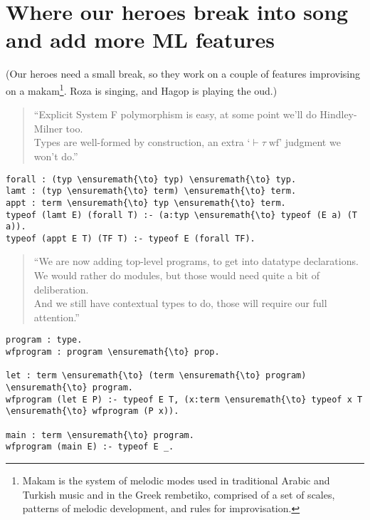 \section{Where our heroes break into song and add more ML
features}\label{where-our-heroes-break-into-song-and-add-more-ml-features}

\begin{scenecomment}
(Our heroes need a small break, so they work on a couple of features improvising on a makam\footnote{Makam is the system of melodic modes used in traditional Arabic and Turkish music and in the Greek rembetiko, comprised of a set of scales, patterns of melodic development, and rules for improvisation.}. Roza is singing, and Hagop is playing the oud.)
\end{scenecomment}

\begin{verse}
``Explicit System F polymorphism is easy, at some point we'll do Hindley-Milner too. \\
Types are well-formed by construction, an extra `$\vdash \tau \; \text{wf}$' judgment we won't do.''
\end{verse}

\begin{verbatim}
forall : (typ \ensuremath{\to} typ) \ensuremath{\to} typ.
lamt : (typ \ensuremath{\to} term) \ensuremath{\to} term.
appt : term \ensuremath{\to} typ \ensuremath{\to} term.
typeof (lamt E) (forall T) :- (a:typ \ensuremath{\to} typeof (E a) (T a)).
typeof (appt E T) (TF T) :- typeof E (forall TF).
\end{verbatim}

\begin{verse}
``We are now adding top-level programs, to get into datatype declarations. \\
We would rather do modules, but those would need quite a bit of deliberation. \\
And we still have contextual types to do, those will require our full attention.''
\end{verse}

\begin{verbatim}
program : type.
wfprogram : program \ensuremath{\to} prop.

let : term \ensuremath{\to} (term \ensuremath{\to} program) \ensuremath{\to} program.
wfprogram (let E P) :- typeof E T, (x:term \ensuremath{\to} typeof x T \ensuremath{\to} wfprogram (P x)).

main : term \ensuremath{\to} program.
wfprogram (main E) :- typeof E _.
\end{verbatim}

